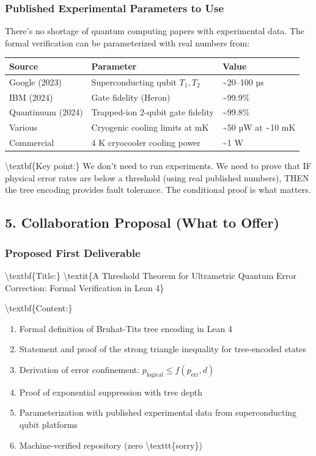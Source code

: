 \documentclass[11pt,a4paper]{article}
\begin{document}
\subsubsection{Published Experimental Parameters to Use}


There's no shortage of quantum computing papers with experimental data. The formal verification can be parameterized with real numbers from:

\begin{tabular}{|l|l|l|}
\hline
\textbf{Source} & \textbf{Parameter} & \textbf{Value} \\
\hline
Google (2023) & Superconducting qubit $T_1, T_2$ & \textasciitilde{}20--100 µs \\
\hline
IBM (2024) & Gate fidelity (Heron) & \textasciitilde{}99.9\% \\
\hline
Quantinuum (2024) & Trapped-ion 2-qubit gate fidelity & \textasciitilde{}99.8\% \\
\hline
Various & Cryogenic cooling limits at mK & \textasciitilde{}50 µW at \textasciitilde{}10 mK \\
\hline
Commercial & 4 K cryocooler cooling power & \textasciitilde{}1 W \\
\hline
\end{tabular}


\textbackslash{}textbf\{Key point:\} We don't need to run experiments. We need to prove that IF physical error rates are below a threshold (using real published numbers), THEN the tree encoding provides fault tolerance. The conditional proof is what matters.

\hrulefill


\subsection{5. Collaboration Proposal (What to Offer)}


\subsubsection{Proposed First Deliverable}


\textbackslash{}textbf\{Title:\} \textbackslash{}textit\{A Threshold Theorem for Ultrametric Quantum Error Correction: Formal Verification in Lean 4\}

\textbackslash{}textbf\{Content:\}
\begin{enumerate}
\item Formal definition of Bruhat-Tits tree encoding in Lean 4
\item Statement and proof of the strong triangle inequality for tree-encoded states
\item Derivation of error confinement: $p_{\text{logical}} \leq f(p_{\text{err}}, d)$
\item Proof of exponential suppression with tree depth
\item Parameterization with published experimental data from superconducting qubit platforms
\item Machine-verified repository (zero \textbackslash{}texttt\{sorry\})
\end{enumerate}
\end{document}
